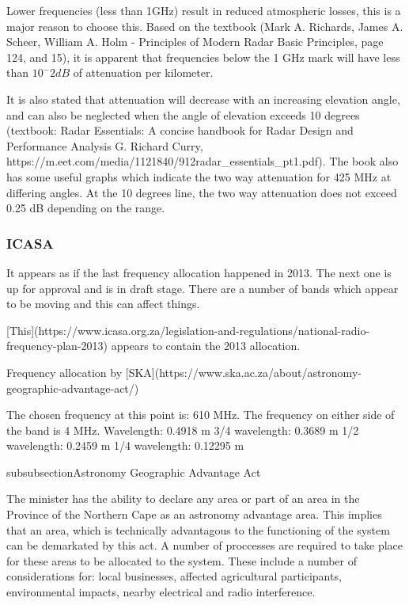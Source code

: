 \documentclass[11pt]{witseiepaper}
\begin{document}
Lower frequencies (less than 1GHz) result in reduced atmospheric losses, this is a major reason to choose this. Based on the textbook (Mark A. Richards, James A. Scheer, William A. Holm - Principles of Modern Radar Basic Principles, page 124, and 15), it is apparent that frequencies below the 1 GHz mark will have less than $10^-2 dB$ of attenuation per kilometer.

It is also stated that attenuation will decrease with an increasing elevation angle, and can also be neglected when the angle of elevation exceeds 10 degrees (textbook: Radar Essentials: A concise handbook for Radar Design and Performance Analysis G. Richard Curry, https://m.eet.com/media/1121840/912radar\_essentials\_pt1.pdf). 
The book also has some useful graphs which indicate the two way attenuation for 425 MHz at differing angles.
At the 10 degrees line, the two way attenuation does not exceed 0.25 dB depending on the range.

\subsubsection{ICASA}

It appears as if the last frequency allocation happened in 2013.
The next one is up for approval and is in draft stage. There are a number of bands which appear to be moving and this can affect things.

[This](https://www.icasa.org.za/legislation-and-regulations/national-radio-frequency-plan-2013) appears to contain the 2013 allocation.

Frequency allocation by [SKA](https://www.ska.ac.za/about/astronomy-geographic-advantage-act/)

The chosen frequency at this point is: 610 MHz.
The frequency on either side of the band is 4 MHz.
Wavelength: 0.4918 m
3/4 wavelength: 0.3689 m
1/2 wavelength: 0.2459 m
1/4 wavelength: 0.12295 m

subsubsection{Astronomy Geographic Advantage Act}

The minister has the ability to declare any area or part of an area in the Province of the Northern Cape as an astronomy advantage area. This implies that an area, which is technically advantagous to the functioning of the system can be demarkated by this act.
A number of proccesses are required to take place for these areas to be allocated to the system. These include a number of considerations for: local businesses, affected agricultural participants, environmental impacts, nearby electrical and radio interference.
\end{document}
